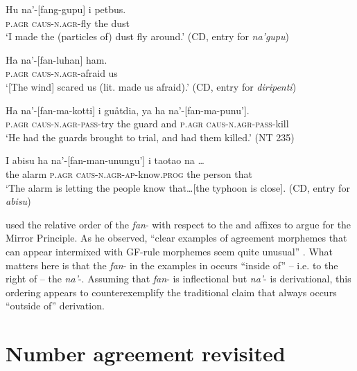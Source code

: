 \documentclass[output=paper,
modfonts
]{LSP/langsci}
\begin{document}
\begin{exe}
\begin{xlist}
\begin{exe}
\ex \label{ex:chung:14} \begin{xlist}
\ex \label{ex:chung:14a}
\gll  Hu na'-{[}fang-gupu{]} i petbus.\\
\textsc{p.agr} \textsc{caus-n.agr-}fly the dust\\
\glt `I made the (particles of) dust fly around.' (CD, entry for \emph{na'gupu})

\ex \label{ex:chung:14b} \gll Ha na'-{[}fan-luhan{]} ham.\\
\textsc{p.agr} \textsc{caus-n.agr-}afraid us\\
\glt `{[}The wind{]} scared us (lit. made us afraid).' (CD, entry for \emph{diripenti})

\ex \label{ex:chung:14c} \gll Ha na'-{[}fan-ma-kotti{]} i guåtdia, ya ha na'-{[}fan-ma-punu'{]}.\\
\textsc{p.agr} \textsc{caus-n.agr-pass-}try the guard and \textsc{p.agr} \textsc{caus-n.agr-pass-}kill\\
\glt `He had the guards brought to trial, and had them killed.' (NT 235)

\ex \label{ex:chung:14d} \gll I abisu ha na'-{[}fan-man-unungu'{]} i taotao na {\ldots}\\
the alarm \textsc{p.agr} \textsc{caus-n.agr-ap-}know.\textsc{prog} the person that\\
\glt `The alarm is letting the people know that{\dots}{[}the typhoon is close{]}.
(CD, entry for \emph{abisu})
\end{xlist}
\end{exe}

\citet{baker1985} used the relative order of the  \emph{fan}- with
respect to the  and  affixes to argue for the Mirror
Principle. As he observed, ``clear examples of agreement morphemes that
can appear intermixed with GF-rule morphemes seem quite unusual'' \citep[386]{baker1985}. What matters here is that the  \emph{fan}- in the examples
in  occurs ``inside of'' -- i.e. to the right of -- the 
\emph{na'}-. Assuming that \emph{fan}- is inflectional but \emph{na'}-
is derivational, this ordering appears to counterexemplify the
traditional claim that  always occurs ``outside of''
derivation.

\section{Number agreement revisited}\label{sec:chung:4}


\end{xlist}
\end{exe}
\end{document}
